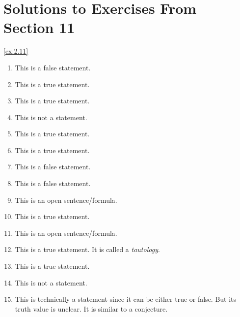 \section*{Solutions to Exercises From Section 11}
\begin{solution}\label{sol:2.11}\ref{ex:2.11}
    \begin{enumerate}
        \item This is a false statement. 
        \item This is a true statement. 
        \item This is a true statement. 
        \item This is not a statement. 
        \item This is a true statement. 
        \item This is a true statement. 
        \item This is a false statement. 
        \item This is a false statement. 
        \item This is an open sentence/formula. 
        \item This is a true statement. 
        \item This is an open sentence/formula. 
        \item This is a true statement. It is called a \emph{tautology}.
        \item This is a true statement. 
        \item This is not a statement. 
        \item This is technically a statement since it can be either true or false. But its truth value is unclear. It is similar to a conjecture. 
    \end{enumerate}
\end{solution}
